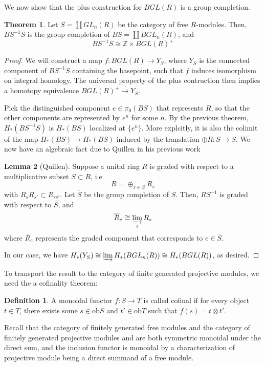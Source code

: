 \documentclass{article}
\theoremstyle{definition}
\newtheorem{theorem}{Theorem}[section]
\theoremstyle{definition}
\newtheorem{definition}{Definition}[theorem]
\theoremstyle{definition}
\theoremstyle{definition}
\theoremstyle{definition}
\newtheorem{lemma}[theorem]{Lemma}
\theoremstyle{definition}
\theoremstyle{definition}
\begin{document}
We now show that the plus construction for $BGL(R)$ is a group completion.

\begin{tcolorbox}[colback=red!5!white,colframe=red!30!white]
\begin{theorem}
Let $S=\coprod GL_n(R)$ be the category of free $R$-modules. Then, $BS^{-1}S$ is the group completion of $BS=\coprod BGL_n(R)$, and 
\[BS^{-1}S\cong \mathbb{Z}\times BGL(R)^{+}\]
\end{theorem}
\end{tcolorbox}
\begin{proof}
    We will construct a map $f:BGL(R)\to Y_S$, where $Y_S$ is the connected component of $BS^{-1}S$ containing the basepoint, such that $f$ induces isomorphism on integral homology. The universal property of the plus contruction then implies a homotopy equivalence $BGL(R)^{+}\to Y_S$.

    Pick the distinguished component $e\in \pi_0(BS)$ that represents $R$, so that the other components are represented by $e^n$ for some $n$. By the previous theorem, $H_*(BS^{-1}S)$ is $H_*(BS)$ localized at $\{e^n\}$. More explcitly, it is also the colimit of the map $H_*(BS)\to H_*(BS)$ induced by the translation $\oplus R:S\to S$. We now have an algebraic fact due to Quillen in his previous work \cite{QGc}

    
    \begin{tcolorbox}
    \begin{lemma}[Quillen]
    Suppose a unital ring $R$ is graded with respect to a multiplicative subset $S\subset R$, i.e 
    \[R=\oplus_{s\in S}R_s\]
    with $R_sR_{s'}\subset R_{ss'}$. Let $\overline{S}$ be the group completion of $S$. Then, $RS^{-1}$ is graded with respect to $\overline{S}$, and 
    \[\overline{R}_e\cong \varinjlim_{s}R_s\]
    where $\overline{R}_e$ represents the graded component that corresponds to $e\in \overline{S}$.
    \end{lemma}
    \end{tcolorbox}
In our case, we have $H_*(Y_S)\cong \varinjlim H_*(BGL_n(R))\cong H_*(BGL(R))$, as desired. 
\end{proof}

To transport the result to the category of finite generated projective modules, we need the a cofinality theorem: 


\begin{tcolorbox}[colback=purple!5!white,colframe=purple!75!black]
\begin{definition}
A monoidal functor $f: S\to T$ is called cofinal if for every object $t\in T$, there exists some $s\in \textrm{ob}S$ and $t'\in \textrm{ob} T$ such that $f(s)=t\otimes t'$.
\end{definition}
\end{tcolorbox}
Recall that the category of finitely generated free modules and the category of finitely generated projective modules and are both symmetric monoidal under the direct sum, and the inclusion functor is monoidal by a characterization of projective module being a direct summand of a free module. 
\end{document}
